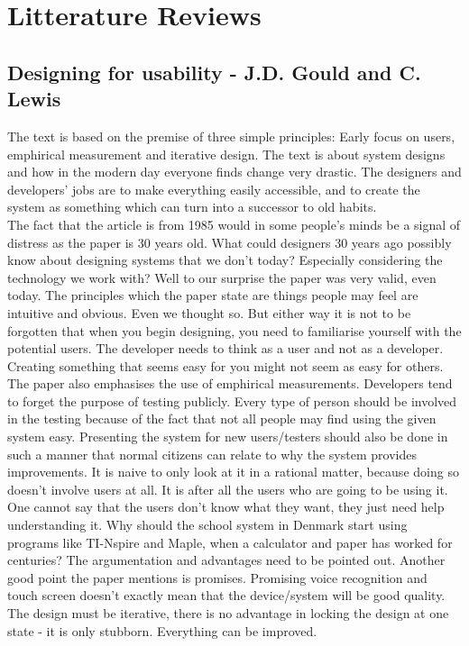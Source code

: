 \documentclass[12pt,a4paper]{article}
\begin{document}
\newpage
\section{Litterature Reviews}
\subsection{Designing for usability - J.D. Gould and C. Lewis}
The text is based on the premise of three simple principles: Early focus on users, emphirical measurement and iterative design. The text is about system designs and how in the modern day everyone finds change very drastic. The designers and developers' jobs are to make everything easily accessible, and to create the system as something which can turn into a successor to old habits. \\
The fact that the article is from 1985 would in some people's minds be a signal of distress as the paper is 30 years old. What could designers 30 years ago possibly know about designing systems that we don't today? Especially considering the technology we work with? Well to our surprise the paper was very valid, even today. The principles which the paper state are things people may feel are intuitive and obvious. Even we thought so. But either way it is not to be forgotten that when you begin designing, you need to familiarise yourself with the potential users. The developer needs to think as a user and not as a developer. Creating something that seems easy for you might not seem as easy for others. The paper also emphasises the use of emphirical measurements. Developers tend to forget the purpose of testing publicly. Every type of person should be involved in the testing because of the fact that not all people may find using the given system easy. Presenting the system for new users/testers should also be done in such a manner that normal citizens can relate to why the system provides improvements. It is naive to only look at it in a rational matter, because doing so doesn't involve users at all. It is after all the users who are going to be using it. One cannot say that the users don't know what they want, they just need help understanding it. Why should the school system in Denmark start using programs like TI-Nspire and Maple, when a calculator and paper has worked for centuries? The argumentation and advantages need to be pointed out. Another good point the paper mentions is promises. Promising voice recognition and touch screen doesn't exactly mean that the device/system will be good quality. The design must be iterative, there is no advantage in locking the design at one state - it is only stubborn. Everything can be improved.
\end{document}
